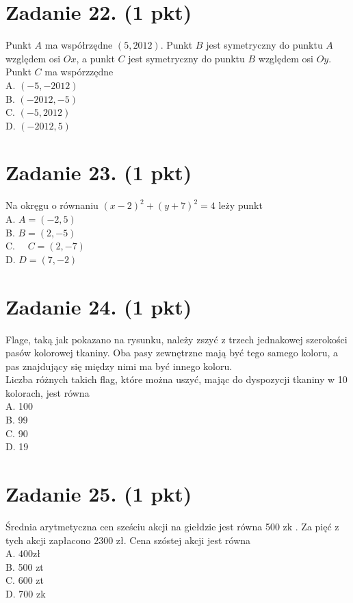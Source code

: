 \documentclass[10pt]{article}
\begin{document}
\section*{Zadanie 22. (1 pkt)}
Punkt \(A\) ma współrzędne \((5,2012)\). Punkt \(B\) jest symetryczny do punktu \(A\) względem osi \(O x\), a punkt \(C\) jest symetryczny do punktu \(B\) względem osi \(O y\). Punkt \(C\) ma wspórzzędne\\
A. \((-5,-2012)\)\\
B. \((-2012,-5)\)\\
C. \((-5,2012)\)\\
D. \((-2012,5)\)

\section*{Zadanie 23. (1 pkt)}
Na okręgu o równaniu \((x-2)^{2}+(y+7)^{2}=4\) leży punkt\\
A. \(A=(-2,5)\)\\
B. \(B=(2,-5)\)\\
C. \(\quad C=(2,-7)\)\\
D. \(D=(7,-2)\)

\section*{Zadanie 24. (1 pkt)}
Flage, taką jak pokazano na rysunku, należy zszyć z trzech jednakowej szerokości pasów kolorowej tkaniny. Oba pasy zewnętrzne mają być tego samego koloru, a pas znajdujący się między nimi ma być innego koloru.\\
Liczba różnych takich flag, które można uszyć, mając do dyspozycji tkaniny w 10 kolorach, jest równa\\
A. 100\\
B. 99\\
C. 90\\
D. 19

\section*{Zadanie 25. (1 pkt)}
Średnia arytmetyczna cen sześciu akcji na giełdzie jest równa 500 zk . Za pięć z tych akcji zapłacono 2300 zł. Cena szóstej akcji jest równa\\
A. \(400 \mathrm{zł}\)\\
B. 500 zt\\
C. 600 zt\\
D. 700 zk
\end{document}
